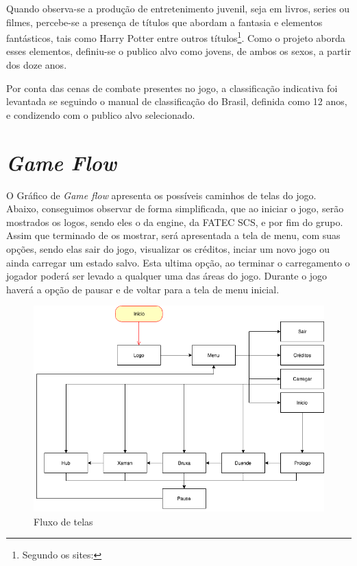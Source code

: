 Quando observa-se a produção de entretenimento juvenil, seja em livros, series ou filmes, percebe-se a presença de títulos que abordam a fantasia e elementos fantásticos, tais como Harry Potter entre outros títulos\footnote{Segundo os sites: }. Como o projeto aborda esses elementos, definiu-se o publico alvo como jovens, de ambos os sexos, a partir dos doze anos.

Por conta das cenas de combate presentes no jogo, a classificação indicativa foi levantada se seguindo o manual de classificação do Brasil\cite{classificacao}, definida como 12 anos, e condizendo com o publico alvo selecionado.

\section{\textit{Game Flow}}

O Gráfico de \textit{Game flow} apresenta os possíveis caminhos de telas do jogo. Abaixo, conseguimos observar de forma simplificada, que ao iniciar o jogo, serão mostrados os logos, sendo eles o da engine, da FATEC SCS, e por fim do grupo. Assim que terminado de os mostrar, será apresentada a tela de menu, com suas opções, sendo elas sair do jogo, visualizar os créditos, inciar um novo jogo ou ainda carregar um estado salvo. Esta ultima opção, ao terminar o carregamento o jogador poderá ser levado a qualquer uma das áreas do jogo.
Durante o jogo haverá a opção de pausar e de voltar para a tela de menu inicial.


\begin{figure}[!htb]
    \caption{\label{fig_grafico}Fluxo de telas} \begin{center}
    \includegraphics[width=\textwidth]{imagens/Flow.png} \end{center}
 \end{figure}

